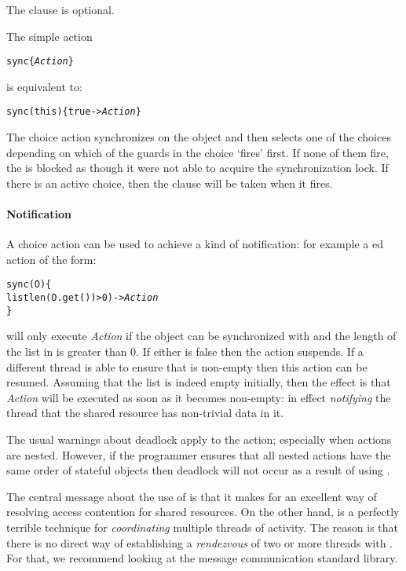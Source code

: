 The  clause is optional.

The simple  action
\begin{alltt}
sync\{ \emph{Action} \}
\end{alltt}
is equivalent to:
\begin{alltt}
sync(this)\{ true -> \emph{Action} \}
\end{alltt}

The  choice action synchronizes on the object and then selects one of the choices depending on which of the guards in the choice `fires' first. If none of them fire, the  is blocked as though it were not able to acquire the synchronization lock. If there is an active  choice, then the  clause will be taken when it fires.

\paragraph{Notification}
A  choice action can be used to achieve a kind of notification: for example a ed action of the form:
\begin{alltt}
sync(O)\{
  listlen(O.get())>0) -> \emph{Action}
\}
\end{alltt}
will only execute \emph{Action} if the object  can be synchronized with and the length of the list in  is greater than 0. If either is false then the action suspends. If a different thread is able to ensure that  is non-empty then this action can be resumed. Assuming that the list is indeed empty initially, then the effect is that \emph{Action} will be executed as soon as it becomes non-empty: in effect \emph{notifying} the thread that the shared resource has non-trivial data in it.

\begin{aside}
The usual warnings about deadlock apply to the  action; especially when  actions are nested. However, if the programmer ensures that all  nested actions have the same order of stateful objects then deadlock will not occur as a result of using .

The central message about the use of  is that it makes for an excellent way of resolving access contention for shared resources. On the other hand,  is a perfectly terrible technique for \emph{coordinating} multiple threads of activity. The reason is that there is no direct way of establishing a \emph{rendezvous} of two or more threads with . For that, we recommend looking at the  message communication standard library.
\end{aside}

